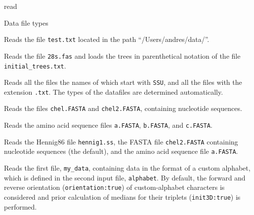 \begin{command}{read}{}
\begin{arguments}
\begin{argumentgroup}{Data file types}
	\end{argumentgroup}
		
	\end{arguments}


	\begin{poyexamples}
	
            {Reads the file \texttt{test.txt} located in the path
            ``/Users/andres/data/''.}

            {Reads the file \texttt{28s.fas} and loads the trees in parenthetical notation
            of the file \texttt{initial\_trees.txt}.}

            {Reads all the files the names of which start with \texttt{SSU}, and all the
            files with the extension \texttt{.txt}. The types of the datafiles are determined
            automatically.}
        
            {Reads the files \texttt{chel.FASTA} and \texttt{chel2.FASTA}, containing nucleotide
            sequences.}

            {Reads the amino acid sequence files \texttt{a.FASTA}, \texttt{b.FASTA}, and
            \texttt{c.FASTA}.}

            {Reads the Hennig86 file \texttt{hennig1.ss}, the FASTA file \texttt{chel2.FASTA}
            containing nucleotide sequences (the default), and the amino acid
            sequence file \texttt{a.FASTA}.}
            
        {Reads the first file, \texttt{my\_data}, containing data in the format of a custom
        alphabet, which is defined in the second input file, \texttt{alphabet}. By default, the
        forward and reverse orientation (\texttt{orientation:true}) of custom-alphabet
        characters is considered and prior calculation of medians for their triplets
        (\texttt{init3D:true}) is performed.}
            

\end{poyexamples}
\end{command}
